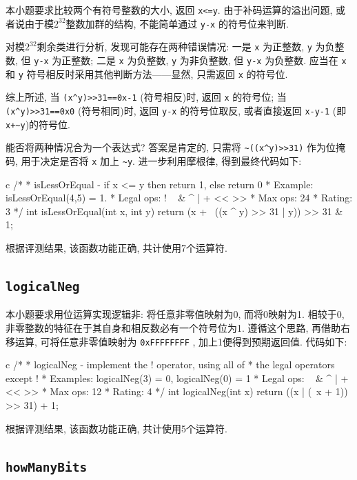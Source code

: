 本小题要求比较两个有符号整数的大小, 返回 \verb|x<=y|. 由于补码运算的溢出问题, 或者说由于模$2^{32}$整数加群的结构, 不能简单通过 \verb|y-x| 的符号位来判断. 

对模$2^{32}$剩余类进行分析, 发现可能存在两种错误情况: 一是 \verb|x| 为正整数, \verb|y| 为负整数, 但 \verb|y-x| 为正整数;  二是 \verb|x| 为负整数, \verb|y| 为非负整数, 但 \verb|y-x| 为负整数. 应当在 \verb|x| 和 \verb|y| 符号相反时采用其他判断方法——显然, 只需返回 \verb|x| 的符号位.

综上所述, 当 \verb|(x^y)>>31==0x-1| (符号相反)时, 返回 \verb|x| 的符号位; 当 \verb|(x^y)>>31==0x0| (符号相同)时, 返回 \verb|y-x| 的符号位取反, 或者直接返回 \verb|x-y-1| (即\verb|x+~y|)的符号位. 

能否将两种情况合为一个表达式? 答案是肯定的, 只需将 \verb|~((x^y)>>31)| 作为位掩码, 用于决定是否将 \verb|x| 加上 \verb|~y|. 进一步利用摩根律, 得到最终代码如下:

\begin{code}{c}
/*
 * isLessOrEqual - if x <= y  then return 1, else return 0
 *   Example: isLessOrEqual(4,5) = 1.
 *   Legal ops: ! ~ & ^ | + << >>
 *   Max ops: 24
 *   Rating: 3
 */
int isLessOrEqual(int x, int y) { return (x + ~((x ^ y) >> 31 | y)) >> 31 & 1; }
\end{code}

根据评测结果, 该函数功能正确, 共计使用7个运算符.

\subsection{\texttt{logicalNeg}}

本小题要求用位运算实现逻辑非: 将任意非零值映射为0, 而将0映射为1. 相较于0, 非零整数的特征在于其自身和相反数必有一个符号位为1. 遵循这个思路, 再借助右移运算, 可将任意非零值映射为 \verb|0xFFFFFFFF| , 加上1便得到预期返回值. 代码如下:

\begin{code}{c}
/*
 * logicalNeg - implement the ! operator, using all of
 *              the legal operators except !
 *   Examples: logicalNeg(3) = 0, logicalNeg(0) = 1
 *   Legal ops: ~ & ^ | + << >>
 *   Max ops: 12
 *   Rating: 4
 */
int logicalNeg(int x) { return ((x | (~x + 1)) >> 31) + 1; }
\end{code}

根据评测结果, 该函数功能正确, 共计使用5个运算符.

\subsection{\texttt{howManyBits}}

